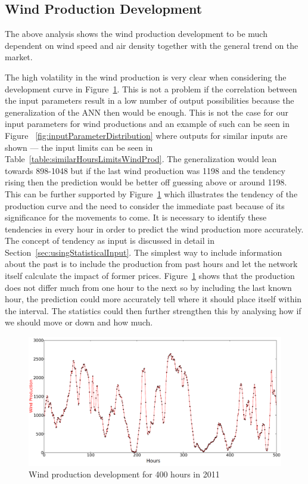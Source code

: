 \subsection{Wind Production Development}
\label{sec:windProductionDev}
The above analysis shows the wind production development to be much dependent on wind speed and air density together with the general trend on the market. 

The high volatility in the wind production is very clear when considering the development curve in Figure~\ref{fig:windHourDevelopment400Hours}. This is not a problem if the correlation between the input parameters result in a low number of output possibilities because the generalization of the ANN then would be enough. This is not the case for our input parameters for wind productions and an example of such can be seen in Figure ~\ref{fig:inputParameterDistribution} where outputs for similar inputs are shown --- the input limits can be seen in Table~\ref{table:similarHoursLimitsWindProd}. The generalization would lean towards 898-1048 but if the last wind production was 1198 and the tendency rising then the prediction would be better off guessing above or around 1198. This can be further supported by Figure~\ref{fig:windHourDevelopment400Hours} which illustrates the tendency of the production curve and the need to consider the immediate past because of its significance for the movements to come. It is necessary to identify these tendencies in every hour in order to predict the wind production more accurately. The concept of tendency as input is discussed in detail in Section~\ref{sec:usingStatisticalInput}. The simplest way to include information about the past is to include the production from past hours and let the network itself calculate the impact of former prices. Figure~\ref{fig:windHourDevelopment400Hours} shows that the production does not differ much from one hour to the next so by including the last known hour, the prediction could more accurately tell where it should place itself within the interval. The statistics could then further strengthen this by analysing how if we should move or down and how much.

\begin{figure}[H]
\centering
\includegraphics[width=0.99\linewidth,natwidth=898,natheight=587]{billeder/productionTendency400Hours.png}
\caption{Wind production development for 400 hours in 2011}
\label{fig:windHourDevelopment400Hours}
\end{figure}

